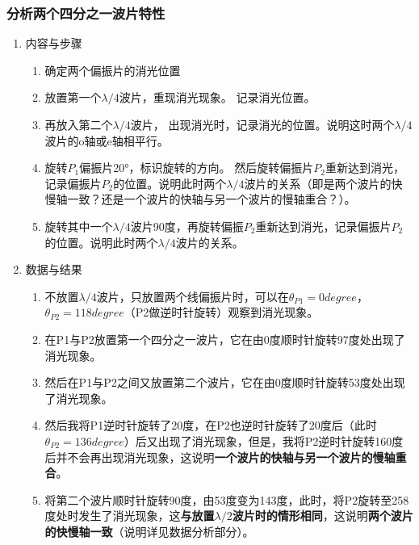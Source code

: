 \documentclass[dvipsnames, svgnames,a4paper,11pt]{article}
\begin{document}
	\subsubsection{分析两个四分之一波片特性}
	\begin{enumerate}
		\item 内容与步骤
		
		\begin{enumerate}
			\item 确定两个偏振片的消光位置
			\item 放置第一个$\lambda/4$波片，重现消光现象。 记录消光位置。
			\item 再放入第二个$\lambda/4$波片， 出现消光时，记录消光的位置。说明这时两个$\lambda/4$波片的o轴或e轴相平行。
			\item 旋转$P_1$偏振片20°，标识旋转的方向。 然后旋转偏振片$P_2$重新达到消光，记录偏振片$P_2$的位置。说明此时两个$\lambda/4$波片的关系（即是两个波片的快慢轴一致？还是一个波片的快轴与另一个波片的慢轴重合？）。
			\item 旋转其中一个$\lambda/4$波片90度，再旋转偏振$P_2$重新达到消光，记录偏振片$P_2$的位置。说明此时两个$\lambda/4$波片的关系。
		\end{enumerate}		
		
		\item 数据与结果
		
		\begin{enumerate}
			\item  不放置$\lambda/4$波片，只放置两个线偏振片时，可以在$\theta_{P1}=0 degree$，$\theta_{P2}=118 degree$（P2做逆时针旋转）观察到消光现象。
			
			\item 在P1与P2放置第一个四分之一波片，它在由0度顺时针旋转97度处出现了消光现象。
			
			\item 然后在P1与P2之间又放置第二个波片，它在由0度顺时针旋转53度处出现了消光现象。
			
			\item 然后我将P1逆时针旋转了20度，在P2也逆时针旋转了20度后（此时$\theta_{P2}=136 degree$）后又出现了消光现象，但是，我将P2逆时针旋转160度后并不会再出现消光现象，这说明\textbf{一个波片的快轴与另一个波片的慢轴重合}。
			
			\item 将第二个波片顺时针旋转90度，由53度变为143度，此时，将P2旋转至258度处时发生了消光现象，这\textbf{与放置$\lambda/2$波片时的情形相同}，这说明\textbf{两个波片的快慢轴一致}（说明详见数据分析部分）。
		\end{enumerate}
		
	\end{enumerate}	
	
\end{document}

